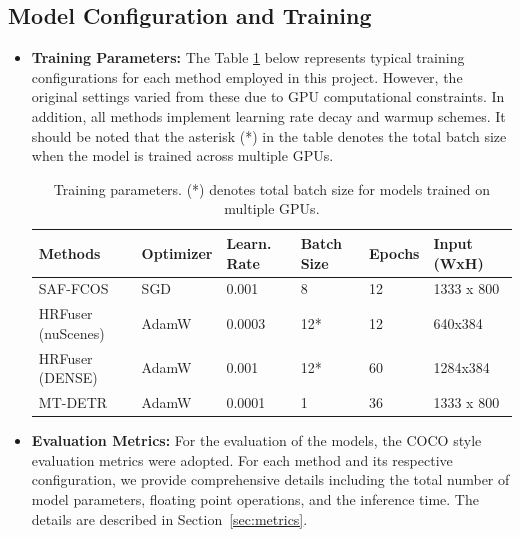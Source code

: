 \documentclass[report.tex]{subfiles}
\begin{document}
        \subsection{Model Configuration and Training}
        \begin{itemize}
            
            \item \textbf{Training Parameters:} The Table \ref{tab:experiment_training_parameters} below represents typical training configurations for each method employed in this project. However, the original settings varied from these due to GPU computational constraints. In addition, all methods implement learning rate decay and warmup schemes. It should be noted that the asterisk (*) in the table denotes the total batch size when the model is trained across multiple GPUs.

            \begin{table}[h]
                \centering
                \caption{Training parameters. (*) denotes total batch size for models trained on multiple GPUs.}
                \begin{tabular}{|l|l|l|l|l|l|}
                \hline
                \textbf{Methods} & \textbf{Optimizer} & \textbf{Learn. Rate} & \textbf{Batch Size} & \textbf{Epochs} & \textbf{Input (WxH)} \\ \hline
                SAF-FCOS         & SGD                & 0.001                & 8                   & 12              & 1333 x 800           \\ \hline
                HRFuser (nuScenes) & AdamW             & 0.0003               & 12*                 & 12              & 640x384              \\ \hline
                HRFuser (DENSE)    & AdamW             & 0.001                & 12*                 & 60              & 1284x384             \\ \hline
                MT-DETR            & AdamW             & 0.0001               & 1                   & 36              & 1333 x 800           \\ \hline
                \end{tabular}
                \label{tab:experiment_training_parameters}
            \end{table}
            
            
            \item \textbf{Evaluation Metrics:} For the evaluation of the models, the COCO style evaluation metrics were adopted. For each method and its respective configuration, we provide comprehensive details including the total number of model parameters, floating point operations, and the inference time. The details are described in Section~\ref{sec:metrics}.
        \end{itemize}
\end{document}
